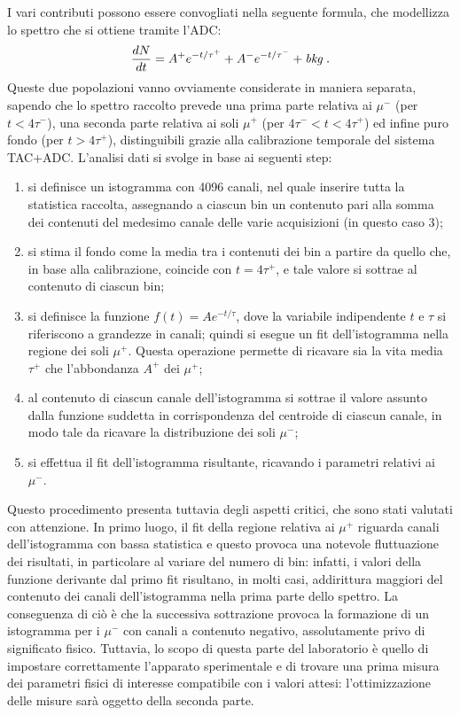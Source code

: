 \documentclass[11pt, oneside, a4paper]{article}   	%
\begin{document}
I vari contributi possono essere convogliati nella seguente formula, che modellizza lo spettro che si ottiene tramite l'ADC:
 \[  \frac{dN}{dt} = A^+ e^{-t/\tau^+} + A^- e^{-t/\tau^-} + \mbox{\emph{bkg\;.}} \]
Queste due popolazioni vanno ovviamente considerate in maniera separata, sapendo che lo spettro raccolto prevede una prima parte relativa ai $\mu^-$ (per $t<4\tau^-$), una seconda parte relativa ai soli $\mu^+$ (per $4\tau^-<t<4\tau^+$) ed infine puro fondo (per $t>4\tau^+$), distinguibili grazie alla calibrazione temporale del sistema TAC+ADC.
L'analisi dati si svolge in base ai seguenti step:
\begin{enumerate}
	\item si definisce un istogramma con 4096 canali, nel quale inserire tutta la statistica raccolta, assegnando a ciascun bin un contenuto pari alla somma dei contenuti del medesimo canale delle varie acquisizioni (in questo caso 3);
	\item si stima il fondo come la media tra i contenuti dei bin a partire da quello che, in base alla calibrazione, coincide con $t=4\tau^+$, e tale valore si sottrae al contenuto di ciascun bin;
	\item si definisce la funzione $f(t)=Ae^{-t/\tau}$, dove la variabile indipendente $t$ e $\tau$ si riferiscono a grandezze in canali; quindi si esegue un fit dell'istogramma nella regione dei soli $\mu^+$. Questa operazione permette di ricavare sia la vita media $\tau^+$ che l'abbondanza $A^+$ dei $\mu^+$; 
	\item al contenuto di ciascun canale dell'istogramma si sottrae il valore assunto dalla funzione suddetta in corrispondenza del centroide di ciascun canale, in modo tale da ricavare la distribuzione dei soli $\mu^-$;
	\item si effettua il fit dell'istogramma risultante, ricavando i parametri relativi ai $\mu^-$.
\end{enumerate}
Questo procedimento presenta tuttavia degli aspetti critici, che sono stati valutati con attenzione. In primo luogo, il fit della regione relativa ai $\mu^+$ riguarda canali dell'istogramma con bassa statistica e questo provoca una notevole fluttuazione dei risultati, in particolare al variare del numero di bin: infatti, i valori della funzione derivante dal primo fit risultano, in molti casi, addirittura maggiori del contenuto dei canali dell'istogramma nella prima parte dello spettro. La conseguenza di ciò è che la successiva sottrazione provoca la formazione di un istogramma per i $\mu^-$ con canali a contenuto negativo, assolutamente privo di significato fisico. Tuttavia, lo scopo di questa parte del laboratorio è quello di impostare correttamente l'apparato sperimentale e di trovare una prima misura dei parametri fisici di interesse compatibile con i valori attesi: l'ottimizzazione delle misure sarà oggetto della seconda parte.
\end{document}
